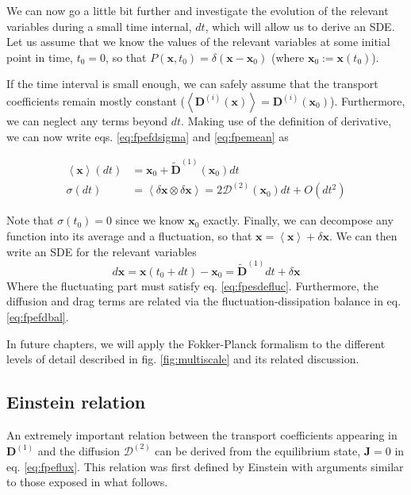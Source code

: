\documentclass[ twoside,openright,titlepage,numbers=noenddot,%
headinclude,footinclude,cleardoublepage=empty,abstract=on,
BCOR=5mm,paper=a4,fontsize=11pt, dvipsnames
]{scrreprt}
\renewcommand{\vec}[1]{\bm{#1}}
\newcommand{\tens}[1]{\bm{\mathcal{#1}}}
\begin{document}
We can now go a little bit further and investigate the evolution of the relevant variables during a small time internal, $dt$, which will allow us to derive an \gls{SDE}.
Let us assume that we know the values of the relevant variables at some initial point in time, $t_0 = 0$, so that $P(\vec{x}, t_0) = \delta(\vec{x}-\vec{x}_0)$ (where $\vec{x}_0 :=\vec{x}(t_0)$).

If the time interval is small enough, we can safely assume that the transport coefficients remain mostly constant ($\left\langle\vec{D}^{(i)}(\vec{x}) \right\rangle = \vec{D}^{(i)}(\vec{x}_0)$). Furthermore, we can neglect any terms beyond $dt$. 
Making use of the definition of derivative, we can now write eqs. \eqref{eq:fpefdsigma} and \eqref{eq:fpemean} as

\begin{align}
    \left\langle\vec{x}\right\rangle(dt) &= \vec{x}_0 + \widetilde{\vec{D}}^{(1)}(\vec{x}_0)dt\label{eq:fpesdemean}\\
    \tens{\sigma}(dt) &= \left\langle \delta\vec{x}\otimes\delta\vec{x}\right\rangle = 2\tens{D}^{(2)}(\vec{x}_0)dt + O(dt^2)\label{eq:fpesdefluc}
\end{align}

Note that $\tens{\sigma}(t_0) = 0$ since we know $\vec{x}_0$ exactly. Finally, we can decompose any function into its average and a fluctuation, so that $\vec{x} = \left\langle\vec{x}\right\rangle + \delta\vec{x}$. We can then write an \gls{SDE} for the relevant variables
\begin{equation}
  \label{eq:fpesde}
  d\vec{x} = \vec{x}(t_0 + dt) - \vec{x}_0 = \widetilde{\vec{D}}^{(1)}dt + \delta\vec{x}
\end{equation}
Where the fluctuating part must satisfy eq. \eqref{eq:fpesdefluc}. Furthermore, the diffusion and drag terms are related via the fluctuation-dissipation balance in eq. \eqref{eq:fpefdbal}.

In future chapters, we will apply the Fokker-Planck formalism to the different levels of detail described in fig. \ref{fig:multiscale} and its related discussion.

\subsection{Einstein relation}\label{sec:einstein}
An extremely important relation between the transport coefficients appearing in $\vec{D}^{(1)}$ and the diffusion $\tens{D}^{(2)}$ can be derived from the equilibrium state, $\vec{J} = 0$ in eq. \eqref{eq:fpeflux}. This relation was first defined by Einstein\cite{Einstein1905} with arguments similar to those exposed in what follows.
\end{document}
